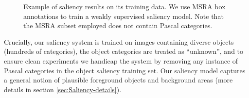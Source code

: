 \documentclass[british,10pt,twocolumn,letterpaper]{article}
\providecommand{\tabularnewline}{\\}
\newcommand{\lyxdot}{.}
\begin{document}
\begin{figure}
\caption{\label{fig:MSRA-saliency}Example of saliency results on its training
data. We use MSRA box annotations to train a weakly supervised saliency
model. Note that the MSRA subset employed does not contain Pascal
categories.}
\end{figure}

 Crucially, our saliency system is trained on images containing diverse
 objects (hundreds of categories), the object categories are treated
 as ``unknown'', and to ensure clean experiments we handicap the
 system by removing any instance of Pascal categories in the object
 saliency training set. Our saliency model captures a general notion
 of plausible foreground objects and background areas (more details
 in section \ref{sec:Saliency-details}).
 
\end{document}
